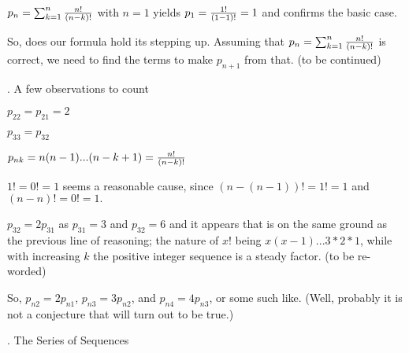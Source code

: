 {\e
$p_n=\sum_{k=1}^n{n!\over(n-k)!}$
with $n=1$ yields $p_1={1!\over(1-1)!}=1$
and confirms the basic case.

\e
So, does our formula hold its stepping up.
Assuming that $p_n=\sum_{k=1}^n{n!\over(n-k)!}$ is correct,
we need to find the terms to make $p_{n+1}$ from that.
(to be continued)
\hfil\eject

. A few observations to count

\indent%
$p_{22}=p_{21}=2$

$p_{33}=p_{32}$

$p_{nk}=n(n-1)...(n-k+1)={n!\over(n-k)!}$

$1!=0!=1$ seems a reasonable cause, since
$(n-(n-1))!=1!=1$ and $(n-n)!=0!=1.$

$p_{32}=2p_{31}$ as $p_{31}=3$ and $p_{32}=6$ and it
appears that is on the same ground as the previous line
of reasoning; the nature of $x!$ being $x(x-1)...3*2*1$,
while with increasing $k$ the positive integer sequence
is a steady factor. (to be re-worded)

So, $p_{n2}=2p_{n1}$, $p_{n3}=3p_{n2}$, and $p_{n4}=4p_{n3}$,
or some such like.
(Well, probably it is not a conjecture that will
turn out to be true.)
}
\hfil\eject
{}. The Series of Sequences

